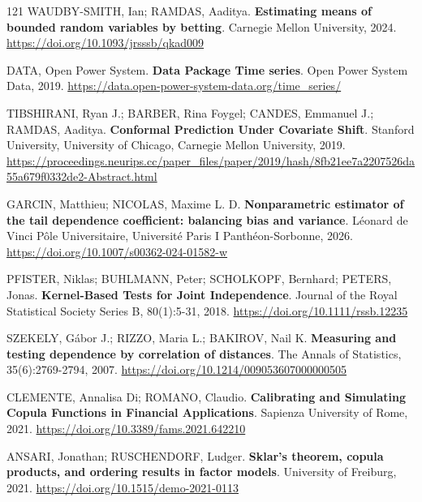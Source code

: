 \begin{thebibliography}{121}
  WAUDBY-SMITH, Ian; RAMDAS, Aaditya.
  \newblock \textbf{Estimating means of bounded random variables by betting}.
  \newblock Carnegie Mellon University, 2024.
  \newblock \url{https://doi.org/10.1093/jrsssb/qkad009}

  DATA, Open Power System.
  \newblock \textbf{Data Package Time series}.
  \newblock Open Power System Data, 2019.
  \newblock \url{https://data.open-power-system-data.org/time_series/}

  TIBSHIRANI, Ryan J.; BARBER, Rina Foygel; CANDES, Emmanuel J.; RAMDAS, Aaditya.
  \newblock \textbf{Conformal Prediction Under Covariate Shift}.
  \newblock Stanford University, University of Chicago, Carnegie Mellon University, 2019.
  \newblock \url{https://proceedings.neurips.cc/paper_files/paper/2019/hash/8fb21ee7a2207526da55a679f0332de2-Abstract.html}

  GARCIN, Matthieu; NICOLAS, Maxime L. D.
  \newblock \textbf{Nonparametric estimator of the tail dependence coefficient: balancing bias and variance}.
  \newblock Léonard de Vinci Pôle Universitaire, Université Paris I Panthéon-Sorbonne, 2026.
  \newblock \url{https://doi.org/10.1007/s00362-024-01582-w}

  PFISTER, Niklas; BUHLMANN, Peter; SCHOLKOPF, Bernhard; PETERS, Jonas.
  \newblock \textbf{Kernel-Based Tests for Joint Independence}.
  \newblock Journal of the Royal Statistical Society Series B, 80(1):5-31, 2018.
  \newblock \url{https://doi.org/10.1111/rssb.12235}

  SZEKELY, Gábor J.; RIZZO, Maria L.; BAKIROV, Nail K.
  \newblock \textbf{Measuring and testing dependence by correlation of distances}.
  \newblock The Annals of Statistics, 35(6):2769-2794, 2007.
  \newblock \url{https://doi.org/10.1214/009053607000000505}

  CLEMENTE, Annalisa Di; ROMANO, Claudio.
  \newblock \textbf{Calibrating and Simulating Copula Functions in Financial Applications}.
  \newblock Sapienza University of Rome, 2021.
  \newblock \url{https://doi.org/10.3389/fams.2021.642210}

  ANSARI, Jonathan; RUSCHENDORF, Ludger.
  \newblock \textbf{Sklar’s theorem, copula products, and ordering results in factor models}.
  \newblock University of Freiburg, 2021.
  \newblock \url{https://doi.org/10.1515/demo-2021-0113}


\end{thebibliography}
